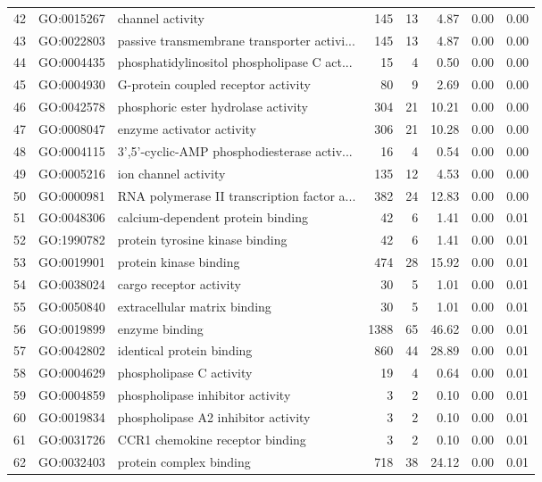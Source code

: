 \begin{table}[ht]
\begin{tabular}{rllrrrrr}
  42 & GO:0015267 & channel activity & 145 &  13 & 4.87 & 0.00 & 0.00 \\ 
  43 & GO:0022803 & passive transmembrane transporter activi... & 145 &  13 & 4.87 & 0.00 & 0.00 \\ 
  44 & GO:0004435 & phosphatidylinositol phospholipase C act... &  15 &   4 & 0.50 & 0.00 & 0.00 \\ 
  45 & GO:0004930 & G-protein coupled receptor activity &  80 &   9 & 2.69 & 0.00 & 0.00 \\ 
  46 & GO:0042578 & phosphoric ester hydrolase activity & 304 &  21 & 10.21 & 0.00 & 0.00 \\ 
  47 & GO:0008047 & enzyme activator activity & 306 &  21 & 10.28 & 0.00 & 0.00 \\ 
  48 & GO:0004115 & 3',5'-cyclic-AMP phosphodiesterase activ... &  16 &   4 & 0.54 & 0.00 & 0.00 \\ 
  49 & GO:0005216 & ion channel activity & 135 &  12 & 4.53 & 0.00 & 0.00 \\ 
  50 & GO:0000981 & RNA polymerase II transcription factor a... & 382 &  24 & 12.83 & 0.00 & 0.00 \\ 
  51 & GO:0048306 & calcium-dependent protein binding &  42 &   6 & 1.41 & 0.00 & 0.01 \\ 
  52 & GO:1990782 & protein tyrosine kinase binding &  42 &   6 & 1.41 & 0.00 & 0.01 \\ 
  53 & GO:0019901 & protein kinase binding & 474 &  28 & 15.92 & 0.00 & 0.01 \\ 
  54 & GO:0038024 & cargo receptor activity &  30 &   5 & 1.01 & 0.00 & 0.01 \\ 
  55 & GO:0050840 & extracellular matrix binding &  30 &   5 & 1.01 & 0.00 & 0.01 \\ 
  56 & GO:0019899 & enzyme binding & 1388 &  65 & 46.62 & 0.00 & 0.01 \\ 
  57 & GO:0042802 & identical protein binding & 860 &  44 & 28.89 & 0.00 & 0.01 \\ 
  58 & GO:0004629 & phospholipase C activity &  19 &   4 & 0.64 & 0.00 & 0.01 \\ 
  59 & GO:0004859 & phospholipase inhibitor activity &   3 &   2 & 0.10 & 0.00 & 0.01 \\ 
  60 & GO:0019834 & phospholipase A2 inhibitor activity &   3 &   2 & 0.10 & 0.00 & 0.01 \\ 
  61 & GO:0031726 & CCR1 chemokine receptor binding &   3 &   2 & 0.10 & 0.00 & 0.01 \\ 
  62 & GO:0032403 & protein complex binding & 718 &  38 & 24.12 & 0.00 & 0.01 \\ 

\end{tabular}
\end{table}
